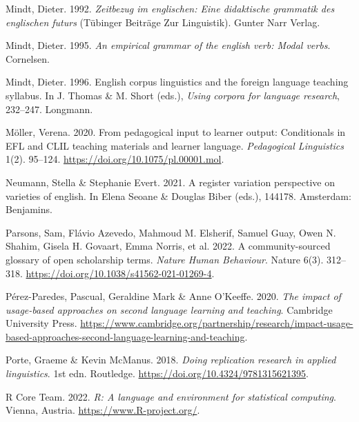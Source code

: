 \documentclass[
  letterpaper,
  DIV=11,
  numbers=noendperiod]{scrreprt}
\newlength{\cslhangindent}
\newenvironment{CSLReferences}[2] %
 {\begin{list}{}{%
  \setlength{\itemindent}{0pt}
  \setlength{\leftmargin}{0pt}
  \setlength{\parsep}{0pt}
  \ifodd #1
   \setlength{\leftmargin}{\cslhangindent}
   \setlength{\itemindent}{-1\cslhangindent}
  \fi
  \setlength{\itemsep}{#2\baselineskip}}}
 {\end{list}}
\begin{document}
\begin{CSLReferences}{1}{0}
Mindt, Dieter. 1992. \emph{Zeitbezug im englischen: Eine didaktische
grammatik des englischen futurs} (Tübinger Beiträge Zur Linguistik).
Gunter Narr Verlag.

Mindt, Dieter. 1995. \emph{An empirical grammar of the english verb:
Modal verbs}. Cornelsen.

Mindt, Dieter. 1996. English corpus linguistics and the foreign language
teaching syllabus. In J. Thomas \& M. Short (eds.), \emph{Using corpora
for language research}, 232--247. Longmann.

Möller, Verena. 2020. From pedagogical input to learner output:
Conditionals in EFL and CLIL teaching materials and learner language.
\emph{Pedagogical Linguistics} 1(2). 95--124.
\url{https://doi.org/10.1075/pl.00001.mol}.

Neumann, Stella \& Stephanie Evert. 2021. A register variation
perspective on varieties of english. In Elena Seoane \& Douglas Biber
(eds.), 144178. Amsterdam: Benjamins.

Parsons, Sam, Flávio Azevedo, Mahmoud M. Elsherif, Samuel Guay, Owen N.
Shahim, Gisela H. Govaart, Emma Norris, et al. 2022. A community-sourced
glossary of open scholarship terms. \emph{Nature Human Behaviour}.
Nature 6(3). 312--318. \url{https://doi.org/10.1038/s41562-021-01269-4}.

Pérez-Paredes, Pascual, Geraldine Mark \& Anne O'Keeffe. 2020. \emph{The
impact of usage-based approaches on second language learning and
teaching}. Cambridge University Press.
\url{https://www.cambridge.org/partnership/research/impact-usage-based-approaches-second-language-learning-and-teaching}.

Porte, Graeme \& Kevin McManus. 2018. \emph{Doing replication research
in applied linguistics}. 1st edn. Routledge.
\url{https://doi.org/10.4324/9781315621395}.

R Core Team. 2022. \emph{R: A language and environment for statistical
computing}. Vienna, Austria. \url{https://www.R-project.org/}.


\end{CSLReferences}
\end{document}
